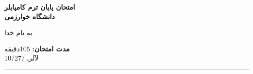 \noindent
\parbox{\dimexpr(\textwidth-2\hrboxsep-2\fboxrule)}{
\parbox{\dimexpr(0.38\textwidth-0.76\hrboxsep-0.76\fboxrule)}{\textbf{
امتحان پایان ترم کامپایلر\\
دانشگاه خوارزمی
}}%
\parbox{\dimexpr(0.3\textwidth-0.6\hrboxsep-0.6\fboxrule)}{\centering	به ‌نام خدا%
\\[2cm]}%
\parbox{\dimexpr(0.32\textwidth-0.64\hrboxsep-0.64\fboxrule)}{\raggedright
\textbf{
مدت امتحان:} 105دقیقه\\
لآلی
/10/27
}}
\hrule
\vspace{3ex}